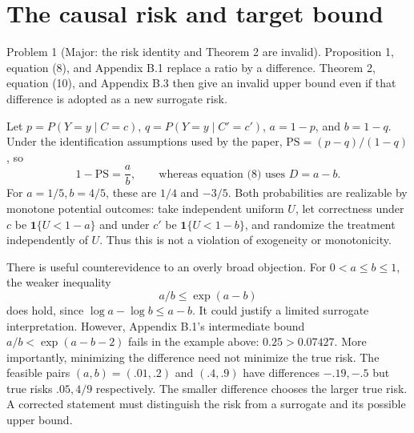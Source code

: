 \documentclass[10pt]{article}
\begin{document}
\section*{The causal risk and target bound}
Problem 1 (Major: the risk identity and Theorem 2 are invalid).  Proposition 1, equation (8), and Appendix B.1 replace a ratio by a difference. Theorem 2, equation (10), and Appendix B.3 then give an invalid upper bound even if that difference is adopted as a new surrogate risk.\par
Let \(p=P(Y=y\mid C=c)\), \(q=P(Y=y\mid C'=c')\), \(a=1-p\), and \(b=1-q\). Under the identification assumptions used by the paper, \(\mathrm{PS}=(p-q)/(1-q)\), so \[1-\mathrm{PS}=\frac{a}{b},\qquad\text{whereas equation (8) uses }D=a-b.\] For \(a=1/5,b=4/5\), these are \(1/4\) and \(-3/5\). Both probabilities are realizable by monotone potential outcomes: take independent uniform \(U\), let correctness under \(c\) be \(\mathbf1\{U<1-a\}\) and under \(c'\) be \(\mathbf1\{U<1-b\}\), and randomize the treatment independently of \(U\). Thus this is not a violation of exogeneity or monotonicity.\par
There is useful counterevidence to an overly broad objection. For \(0<a\le b\le1\), the weaker inequality \[a/b\le \exp(a-b)\] does hold, since \(\log a-\log b\le a-b\). It could justify a limited surrogate interpretation. However, Appendix B.1’s intermediate bound \(a/b<\exp(a-b-2)\) fails in the example above: \(0.25>0.07427\). More importantly, minimizing the difference need not minimize the true risk. The feasible pairs \((a,b)=(.01,.2)\) and \((.4,.9)\) have differences \(-.19,-.5\) but true risks \(.05,4/9\) respectively. The smaller difference chooses the larger true risk. A corrected statement must distinguish the risk from a surrogate and its possible upper bound.\par
\end{document}
